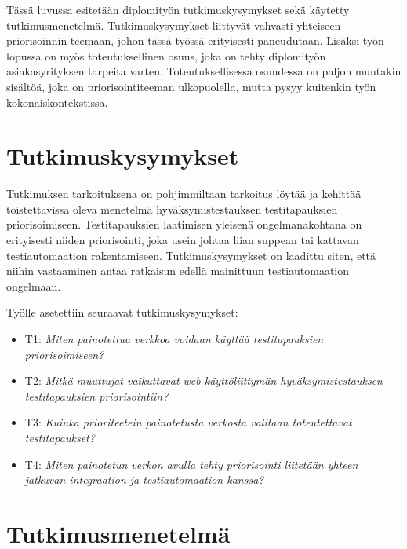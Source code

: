 Tässä luvussa esitetään diplomityön tutkimuskysymykset sekä käytetty tutkimusmenetelmä.
Tutkimuskysymykset liittyvät vahvasti yhteiseen priorisoinnin teemaan, johon tässä työssä erityisesti paneudutaan.
Lisäksi työn lopussa on myös toteutuksellinen osuus, joka on tehty diplomityön asiakasyrityksen tarpeita varten.
Toteutuksellisessa osuudessa on paljon muutakin sisältöä, joka on priorisointiteeman ulkopuolella, mutta pysyy kuitenkin työn kokonaiskontekstissa.

\section{Tutkimuskysymykset}

Tutkimuksen tarkoituksena on pohjimmiltaan tarkoitus löytää ja kehittää toistettavissa oleva menetelmä hyväksymistestauksen testitapauksien priorisoimiseen.
Testitapauksien laatimisen yleisenä ongelmanakohtana on erityisesti niiden priorisointi, joka usein johtaa liian suppean tai kattavan testiautomaation rakentamiseen.
Tutkimuskysymykset on laadittu siten, että niihin vastaaminen antaa ratkaisun edellä mainittuun testiautomaation ongelmaan.

Työlle asetettiin seuraavat tutkimuskysymykset:
\begin{itemize}
	\item T1: \emph{Miten painotettua verkkoa voidaan käyttää testitapauksien priorisoimiseen?}
  \item T2: \emph{Mitkä muuttujat vaikuttavat web-käyttöliittymän hyväksymistestauksen testitapauksien priorisointiin?}
  \item T3: \emph{Kuinka prioriteetein painotetusta verkosta valitaan toteutettavat testitapaukset?}
  \item T4: \emph{Miten painotetun verkon avulla tehty priorisointi liitetään yhteen jatkuvan integraation ja testiautomaation kanssa?}
\end{itemize}

\section{Tutkimusmenetelmä}

